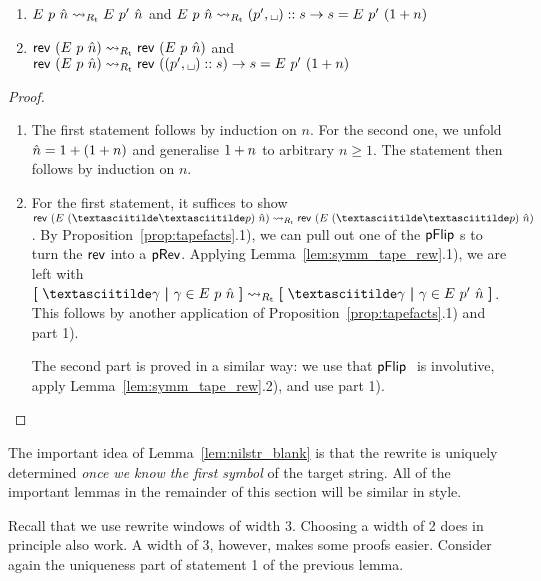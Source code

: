 \begin{lemma}\label{lem:nilstr_blank}\leavevmode
  \begin{enumerate}
    \item $E~p~\hat{n} \rightsquigarrow_{R_{\text{t}}} E~p'~\hat{n}$ and $\nilstr{p}{\hat{n}} \strent{\Rtape} (p', \blank) :: s \rightarrow s = \nilstr{p'}{(\natS{n})}$
    \item $\mathsf{rev}~{(E~p~\hat{n})} \rightsquigarrow_{R_{\text{t}}} \mathsf{rev}~{(E~p~\hat{n})}$ and $\rev~{(\nilstr{p}{\hat{n}})} \strent{\Rtape} \rev~{((p', \blank) :: s)} \rightarrow s = \nilstr{p'}{(\natS{n})}$
  \end{enumerate}
\end{lemma}
\begin{proof}
  \begin{enumerate}
    \item The first statement follows by induction on $n$. For the second one, we unfold $\hat{n} = 1 +{(1 +{n})}$ and generalise $1 +{n}$ to arbitrary $n \ge 1$. The statement then follows by induction on $n$. 
    \item For the first statement, it suffices to show $\rev~{(\nilstr{(\pFlipi{\pFlipi{p}})}{\hat{n}})} \strent{\Rtape} \rev~{(\nilstr{(\pFlipi{\pFlipi{p}})}{\hat{n}})}$. By Proposition~\ref{prop:tapefacts}.1), we can pull out one of the $\pFlip$s to turn the $\mathsf{rev}$ into a $\textsf{pRev}$. Applying Lemma~\ref{lem:symm_tape_rew}.1), we are left with $\withl \pFlipi{\gamma} \withm \gamma \in \nilstr{p}{\hat{n}} \withr \strent{\Rtape} \withl \pFlipi{\gamma} \withm \gamma \in \nilstr{p'}{\hat{n}} \withr$. This follows by another application of Proposition~\ref{prop:tapefacts}.1) and part 1). 

      The second part is proved in a similar way: we use that $\pFlip$ is involutive, apply Lemma~\ref{lem:symm_tape_rew}.2), and use part 1).
  \end{enumerate}
\end{proof}

The important idea of Lemma~\ref{lem:nilstr_blank} is that the rewrite is uniquely determined \emph{once we know the first symbol} of the target string. All of the important lemmas in the remainder of this section will be similar in style.

\begin{remark}
  Recall that we use rewrite windows of width 3. Choosing a width of 2 does in principle also work. 
  A width of 3, however, makes some proofs easier. Consider again the uniqueness part of statement 1 of the previous lemma. 
\end{remark}

